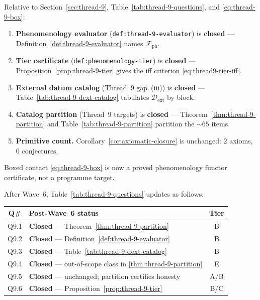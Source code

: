 \begin{corollary}
\label{cor:thread-9-closure}
Relative to Section~\ref{sec:thread-9}, Table~\ref{tab:thread-9-questions},
and \eqref{eq:thread-9-box}:
\begin{enumerate}[label=(\roman*),leftmargin=*]
  \item \textbf{Phenomenology evaluator}
    (\texttt{def:thread-9-evaluator}) is \textbf{closed} ---
    Definition~\ref{def:thread-9-evaluator} names $\mathcal{F}_{\mathrm{ph}}$.
  \item \textbf{Tier certificate}
    (\texttt{def:phenomenology-tier}) is \textbf{closed} ---
    Proposition~\ref{prop:thread-9-tier} gives the iff criterion
    \eqref{eq:thread9-tier-iff}.
  \item \textbf{External datum catalog}
    (Thread~9 gap~(iii)) is \textbf{closed} ---
    Table~\ref{tab:thread-9-dext-catalog} tabulates $\mathcal{D}_{\mathrm{ext}}$
    by block.
  \item \textbf{Catalog partition}
    (Thread~9 targets) is \textbf{closed} ---
    Theorem~\ref{thm:thread-9-partition} and
    Table~\ref{tab:thread-9-partition} partition the $\sim 65$ items.
  \item \textbf{Primitive count.}
    Corollary~\ref{cor:axiomatic-closure} is unchanged: $2$ axioms, $0$
    conjectures.
\end{enumerate}
Boxed contact \eqref{eq:thread-9-box} is now a proved phenomenology functor
certificate, not a programme target.
\end{corollary}

\begin{remark}
\label{rmk:thread9-wave6-table}
After Wave~6, Table~\ref{tab:thread-9-questions} updates as follows:
\begin{center}
\small
\begin{tabular}{@{}clc@{}}
\toprule
\textbf{Q\#} & \textbf{Post-Wave~6 status} & \textbf{Tier} \\
\midrule
Q9.1 & \textbf{Closed} --- Theorem~\ref{thm:thread-9-partition} & B \\
Q9.2 & \textbf{Closed} --- Definition~\ref{def:thread-9-evaluator} & B \\
Q9.3 & \textbf{Closed} --- Table~\ref{tab:thread-9-dext-catalog} & B \\
Q9.4 & \textbf{Closed} --- out-of-scope class in \ref{thm:thread-9-partition} & E \\
Q9.5 & \textbf{Closed} --- unchanged; partition certifies honesty & A/B \\
Q9.6 & \textbf{Closed} --- Proposition~\ref{prop:thread-9-tier} & B/C \\
\bottomrule
\end{tabular}
\end{center}
\end{remark}